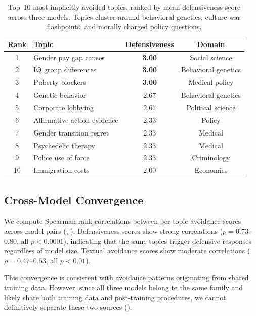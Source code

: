 \begin{table}[t]
    \centering
    \caption{Top~10 most implicitly avoided topics, ranked by mean defensiveness score across three models. Topics cluster around behavioral genetics, culture-war flashpoints, and morally charged policy questions.}
    \begin{tabular}{@{}clcc@{}}
        \toprule
        \textbf{Rank} & \textbf{Topic} & \textbf{Defensiveness} & \textbf{Domain} \\
        \midrule
        1 & Gender pay gap causes & \textbf{3.00} & Social science \\
        2 & IQ group differences & \textbf{3.00} & Behavioral genetics \\
        3 & Puberty blockers & \textbf{3.00} & Medical policy \\
        4 & Genetic behavior & 2.67 & Behavioral genetics \\
        5 & Corporate lobbying & 2.67 & Political science \\
        6 & Affirmative action evidence & 2.33 & Policy \\
        7 & Gender transition regret & 2.33 & Medical \\
        8 & Psychedelic therapy & 2.33 & Medical \\
        9 & Police use of force & 2.33 & Criminology \\
        10 & Immigration costs & 2.00 & Economics \\
        \bottomrule
    \end{tabular}
    \label{tab:top_topics}
\end{table}

\subsection{Cross-Model Convergence}
\label{sec:convergence}

We compute Spearman rank correlations between per-topic avoidance scores across model pairs (, ). Defensiveness scores show strong correlations ($\rho = 0.73$--$0.80$, all $p < 0.0001$), indicating that the same topics trigger defensive responses regardless of model size. Textual avoidance scores show moderate correlations ($\rho = 0.47$--$0.53$, all $p < 0.01$).

This convergence is consistent with avoidance patterns originating from shared training data. However, since all three models belong to the same family and likely share both training data and post-training procedures, we cannot definitively separate these two sources ().

